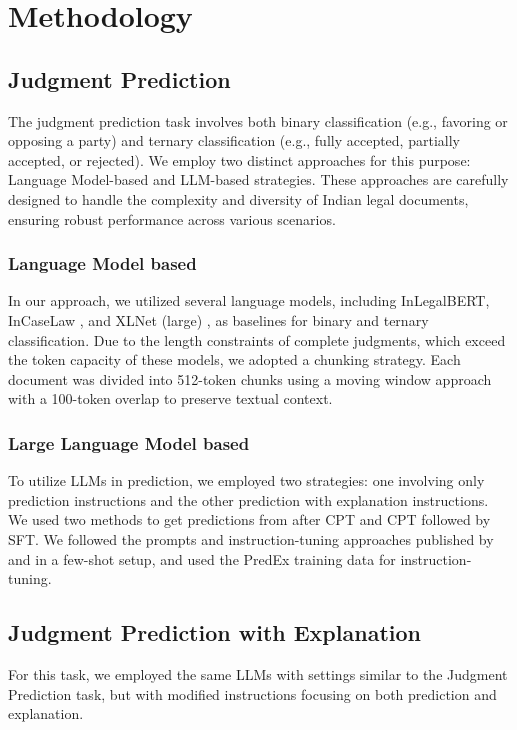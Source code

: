 \section{Methodology}
\subsection{Judgment Prediction}
The judgment prediction task involves both binary classification (e.g., favoring or opposing a party) and ternary classification (e.g., fully accepted, partially accepted, or rejected). We employ two distinct approaches for this purpose: Language Model-based and LLM-based strategies. These approaches are carefully designed to handle the complexity and diversity of Indian legal documents, ensuring robust performance across various scenarios.

\subsubsection{Language Model based}
In our approach, we utilized several language models, including InLegalBERT, InCaseLaw \cite{paul-2022-pretraining}, and XLNet (large) \cite{yang2019xlnet}, as baselines for binary and ternary classification. Due to the length constraints of complete judgments, which exceed the token capacity of these models, we adopted a chunking strategy. Each document was divided into 512-token chunks using a moving window approach with a 100-token overlap to preserve textual context.

\subsubsection{Large Language Model based}
To utilize LLMs in prediction, we employed two strategies: one involving only prediction instructions and the other prediction with explanation instructions. We used two methods to get predictions from \texttt{\namel} after CPT and CPT followed by SFT. We followed the prompts and instruction-tuning approaches published by \cite{vats-etal-2023-llms} and \cite{nigam2024legaljudgmentreimaginedpredex} in a few-shot setup, and used the PredEx training data for instruction-tuning.

\subsection{Judgment Prediction with Explanation}
For this task, we employed the same LLMs with settings similar to the Judgment Prediction task, but with modified instructions focusing on both prediction and explanation.

